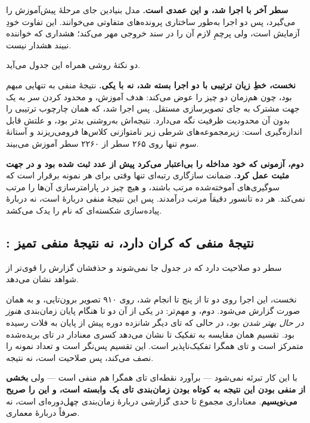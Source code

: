 \textbf{سطر آخر با  اجرا شد، و این عمدی است.} مدل بنیادین
جای مرحلهٔ پیش‌آموزش  را می‌گیرد، پس دو اجرا به‌طور ساختاری پرونده‌های متفاوتی
می‌خوانند. این تفاوت خودِ آزمایش است، ولی پرچمِ لازم آن را در سند خروجی مهر می‌کند؛ هشداری که
خواننده نبیند هشدار نیست.

دو نکتهٔ روشی همراه این جدول می‌آید.

\textbf{نخست، خطِ زیان ترتیبی با دو اجرا بسته شد، نه با یکی.} نتیجهٔ منفی  به تنهایی
مبهم بود، چون  هم‌زمان دو چیز را عوض می‌کند: هدف آموزش، و محدود کردن سر به یک جهت
مشترک به جای  تصویرسازی مستقل. پس  اجرا شد، که همان چارچوب ترتیبی را بدون آن
محدودیت ظرفیت نگه می‌دارد. نتیجه‌اش به‌روشنی بدتر بود، و علتش قابل اندازه‌گیری است:
زیرمجموعه‌های شرطی  زیر نامتوازنی کلاس‌ها فرومی‌ریزند و آستانهٔ سوم تنها روی \num{۲۶۵} سطر
از \num{۲۲۶۰} سطر آموزش می‌بیند.

\textbf{دوم، آزمونی که خود مداخله را بی‌اعتبار می‌کرد پیش از عدد ثبت شده بود و در جهت مثبت
عمل کرد.} ضمانت سازگاری رتبه‌ای  تنها وقتی برای هر نمونه برقرار است که سوگیری‌های
آموخته‌شده مرتب باشند، و هیچ چیز در پارامترسازی آن‌ها را مرتب نمی‌کند. هر ده تانسور دقیقاً
مرتب درآمدند. پس این نتیجهٔ منفی دربارهٔ  است، نه دربارهٔ پیاده‌سازی شکسته‌ای که نام
 را یدک می‌کشد.

\subsection{: نتیجهٔ منفی که کران دارد، نه نتیجهٔ منفی تمیز}

سطر  دو صلاحیت دارد که در جدول جا نمی‌شوند و حذفشان گزارش را قوی‌تر از شواهد
نشان می‌دهد.

نخست، این اجرا روی دو تا از پنج تا انجام شد، روی \num{۹۱۰} تصویر برون‌تایی، و به همان صورت گزارش
می‌شود. دوم، و مهم‌تر:  در یکی از آن دو تا هنگام پایان زمان‌بندی \emph{هنوز در
حال بهتر شدن بود}، در حالی که تای دیگر شانزده دوره پیش از پایان به فلات رسیده بود. تقسیم همان
مقایسه به تفکیک تا نشان می‌دهد کسری معنادار در تای بریده‌شده متمرکز است و تای همگرا
تفکیک‌ناپذیر است. این تقسیم پس‌نگر است و تعداد نمونه را نصف می‌کند، پس صلاحیت است، نه نتیجه.

 با این کار تبرئه نمی‌شود — برآورد نقطه‌ای تای همگرا هم منفی است — ولی
\textbf{بخشی از منفی بودن این نتیجه به کوتاه بودن زمان‌بندی تای یک وابسته است، و این را صریح
می‌نویسیم}. معناداری مجموع تا حدی گزارشی دربارهٔ زمان‌بندی چهل‌دوره‌ای است، نه صرفاً دربارهٔ
معماری.

